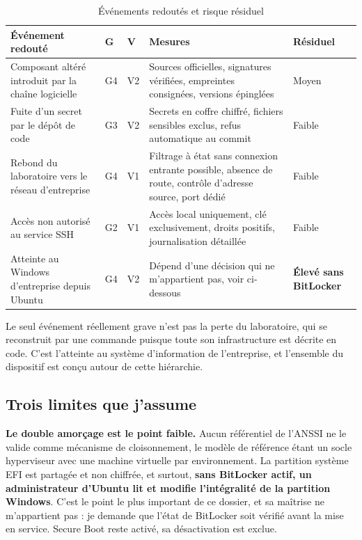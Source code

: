 \documentclass[11pt,a4paper]{article}
\begin{document}
\begin{table}[H]
\centering
\caption{Événements redoutés et risque résiduel}
\small
\begin{tabularx}{\textwidth}{@{}L{3.9cm}C{0.7cm}C{0.7cm}Y C{1.4cm}@{}}
\toprule
\textbf{Événement redouté} & \textbf{G} & \textbf{V} & \textbf{Mesures} & \textbf{Résiduel} \\
\midrule
Composant altéré introduit par la chaîne logicielle & G4 & V2 &
Sources officielles, signatures vérifiées, empreintes consignées, versions épinglées & Moyen \\
\addlinespace
Fuite d'un secret par le dépôt de code & G3 & V2 &
Secrets en coffre chiffré, fichiers sensibles exclus, refus automatique au commit & Faible \\
\addlinespace
Rebond du laboratoire vers le réseau d'entreprise & G4 & V1 &
Filtrage à état sans connexion entrante possible, absence de route, contrôle d'adresse source, port dédié & Faible \\
\addlinespace
Accès non autorisé au service SSH & G2 & V1 &
Accès local uniquement, clé exclusivement, droits positifs, journalisation détaillée & Faible \\
\addlinespace
Atteinte au Windows d'entreprise depuis Ubuntu & G4 & V2 &
Dépend d'une décision qui ne m'appartient pas, voir ci-dessous & \textbf{Élevé sans BitLocker} \\
\bottomrule
\end{tabularx}
\end{table}

Le seul événement réellement grave n'est pas la perte du laboratoire, qui se
reconstruit par une commande puisque toute son infrastructure est décrite en
code. C'est l'atteinte au système d'information de l'entreprise, et l'ensemble du
dispositif est conçu autour de cette hiérarchie.

\subsection*{Trois limites que j'assume}

\textbf{Le double amorçage est le point faible.} Aucun référentiel de l'ANSSI ne
le valide comme mécanisme de cloisonnement, le modèle de référence étant un socle
hyperviseur avec une machine virtuelle par environnement. La partition système EFI
est partagée et non chiffrée, et surtout, \textbf{sans BitLocker actif, un
administrateur d'Ubuntu lit et modifie l'intégralité de la partition Windows}.
C'est le point le plus important de ce dossier, et sa maîtrise ne m'appartient
pas : je demande que l'état de BitLocker soit vérifié avant la mise en service.
Secure Boot reste activé, sa désactivation est exclue.
\end{document}
